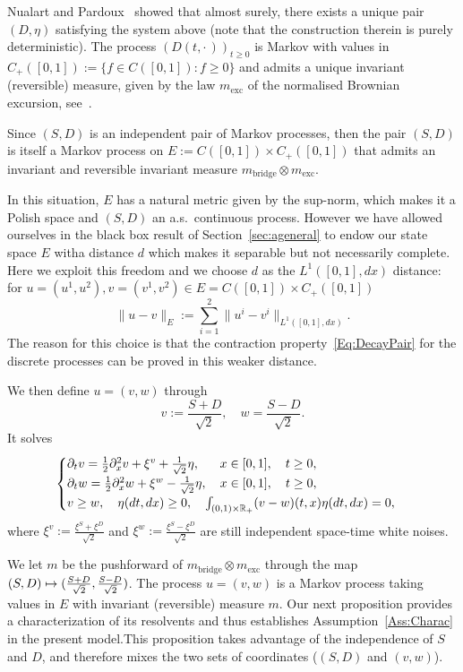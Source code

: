 \documentclass[AHL,Unicode,longabstracts]{cedram}
\theoremstyle{plain}
\newcommand{\R}{\mathbb{R}}
\newcommand{\mBB}{m_{\mathrm{bridge}}}
\newcommand{\mBE}{m_{\mathrm{exc}}}
\let\oldmapsto\mapsto
\renewcommand*{\mapsto}{\mathchoice{\longmapsto}{\oldmapsto}{\oldmapsto}{\oldmapsto}}
\begin{document}
Nualart and Pardoux~\cite{NualartPardoux92} showed that almost surely, there exists a unique pair $(D,\eta)$ satisfying the system above (note that the construction therein is purely deterministic). The process $(D(t,\cdot\,))_{t\geq 0}$ is Markov with values in $C_+([0,1]):=\{f\in C([0,1]): f\geq 0\}$ and admits a unique invariant (reversible) measure, given by the law $\mBE$ of the normalised Brownian excursion, see~\cite{MR3616274,Zambotti2001}.

Since $(S,D)$ is an independent pair of Markov processes, then the pair $(S,D)$ is itself a Markov process on $E:=C([0,1])\times C_+([0,1])$ that admits an invariant and reversible invariant measure $\mBB \otimes \mBE$.

In this situation, $E$ has a natural metric given by the sup-norm, which makes it a Polish space and $(S,D)$ an a.s.~continuous process. However we have allowed ourselves in the black box result of Section~\ref{sec:ageneral} to endow our state space $E$ with\linebreak a distance $d$ which makes it separable but not necessarily complete. Here we exploit this freedom and we choose $d$ as the $L^1([0,1],dx)$ distance: for $u=(u^1,u^2), v=(v^1,v^2)\in E=C([0,1])\times C_+([0,1])$
\[
\|u-v\|_E:=\sum_{i=1}^2\|u^i-v^i\|_{L^1([0,1],dx)}.
\]
The reason for this choice is that the contraction property~\eqref{Eq:DecayPair} for the discrete processes can be proved in this weaker distance.

We then define $u=(v,w)$ through
\[
v := \frac{S+D}{\sqrt 2} ,\quad w = \frac{S-D}{\sqrt 2}.
\]
It solves
\begin{equation}\label{eq:theSPDEs}
\begin{cases}
\partial_t v = \frac12\partial^2_x v + \xi^v + \frac1{\sqrt 2}\eta,\mkern29mu x\in [0,1],\quad t\ge 0,\\
\partial_t w = \frac12\partial^2_x w + \xi^w - \frac1{\sqrt 2}\eta,\quad x\in [0,1],\quad t\ge 0,\\
v\ge w,\quad \eta(dt,dx)\ge 0,\quad \int_{(0,1)\times \R_+} (v-w)(t,x) \eta(dt,dx) = 0,
\end{cases}
\end{equation}
where $\xi^v := \frac{\xi^S+\xi^D}{\sqrt 2}$ and $\xi^w:=\frac{\xi^S - \xi^D}{\sqrt 2}$ are still independent space-time white noises.

We let $m$ be the pushforward of $\mBB\otimes \mBE$ through the map $(S,D) \mapsto (\frac{S+D}{\sqrt 2}, \frac{ S-D }{\sqrt 2})$. The process $u=(v,w)$ is a Markov process taking values in $E$ with invariant (reversible) measure $m$. Our next proposition provides a characterization of its resolvents and thus establishes Assumption~\ref{Ass:Charac} in the present model.\linebreak This proposition takes advantage of the independence of $S$ and $D$, and therefore mixes the two sets of coordinates ($(S,D)$ and $(v,w)$).
\end{document}
